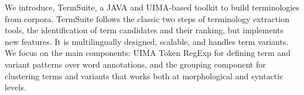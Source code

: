We introduce, TermSuite, a  JAVA and UIMA-based toolkit to build terminologies from corpora. TermSuite follows the classic two steps of terminology extraction tools, the identification of term candidates and their ranking, but implements new features. It is multilingually designed, scalable, and handles term variants. We focus on the main components: UIMA Token RegExp for defining term and variant patterns over word annotations, and the grouping component for clustering terms and variants that works both at morphological and syntactic levels.
